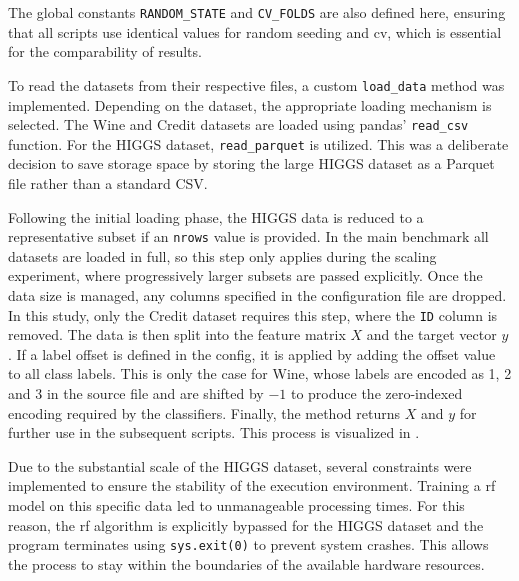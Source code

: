 The global constants \texttt{RANDOM\_STATE} and \texttt{CV\_FOLDS} are also defined 
here, ensuring that all scripts use identical values for random seeding and 
\gls{cv}, which is essential for the comparability of results.

\label{implementation_data_loading}
To read the datasets from their respective files, a custom \texttt{load\_data} method was implemented. Depending on the dataset, the appropriate loading mechanism is selected. The Wine and Credit datasets are loaded using pandas' \texttt{read\_csv} function. For the HIGGS dataset, \texttt{read\_parquet} is utilized. This was a deliberate decision to save storage space by storing the large HIGGS dataset as a Parquet file rather than a standard CSV.

Following the initial loading phase, the HIGGS data is reduced to a representative subset if an \texttt{nrows} value is provided. In the main benchmark all datasets are loaded in full, so this step only applies during the scaling experiment, where progressively larger subsets are passed explicitly. Once the data size is managed, any columns specified in the configuration file are dropped. In this study, only the Credit dataset requires this step, where the \texttt{ID} column is removed. The data is then split into the feature matrix $X$ and the target vector $y$. If a label offset is defined in the config, it is applied by adding the offset value to all class labels. This is only the case for Wine, whose labels are encoded as 1, 2 and 3 in the source file and are shifted by $-1$ to produce the zero-indexed encoding required by the classifiers. Finally, the method returns $X$ and $y$ for further use in the subsequent scripts. This process is visualized in .

Due to the substantial scale of the HIGGS dataset, several constraints were implemented to ensure the stability of the execution environment. Training a \gls{rf} model on this specific data led to unmanageable processing times. For this reason, the \gls{rf} algorithm is explicitly bypassed for the HIGGS dataset and the program terminates using \texttt{sys.exit(0)} to prevent system crashes. This allows the process to stay within the boundaries of the available hardware resources.

